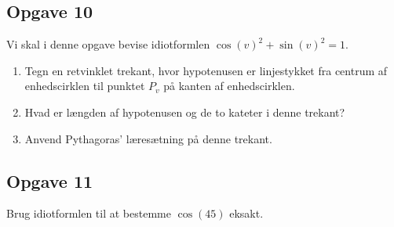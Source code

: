 \subsection*{Opgave 10}

Vi skal i denne opgave bevise idiotformlen $\cos(v)^2 + \sin(v)^2 = 1$.

\begin{enumerate}[label=\roman*)]
	\item Tegn en retvinklet trekant, hvor hypotenusen er linjestykket fra centrum af enhedscirklen til 
	punktet $P_v$ på kanten af enhedscirklen. 
	\item Hvad er længden af hypotenusen og de to kateter i denne trekant?
	\item Anvend Pythagoras' læresætning på denne trekant.
\end{enumerate}

\subsection*{Opgave 11}

Brug idiotformlen til at bestemme $\cos(45)$ eksakt.

